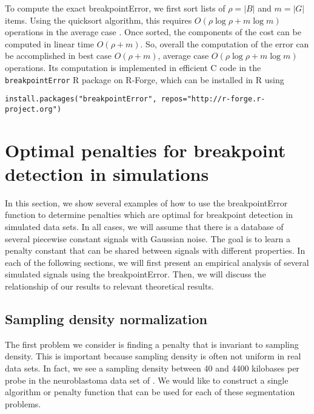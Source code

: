 \documentclass{jsfds} %
\begin{document}
To compute the exact breakpointError, we first sort lists of $\rho=|B|$
and $m=|G|$ items. Using the quicksort algorithm, this requires
$O(\rho\log \rho + m\log m)$ operations in the average case
\citep{clrs}. Once sorted, the components of the cost can be computed
in linear time $O(\rho + m)$. So, overall the computation of the error
can be accomplished in best case $O(\rho + m)$, average case $O(\rho\log \rho +
m\log m)$ operations. Its computation is implemented in efficient C
code in the \verb|breakpointError| R package on R-Forge, which can be
installed in R using

\begin{verbatim}
install.packages("breakpointError", repos="http://r-forge.r-project.org")
\end{verbatim}


\newpage

\section{Optimal penalties for breakpoint detection in simulations}
\label{sec:simulations}
In this section, we show several examples of how to use the
breakpointError function to determine penalties which are optimal for
breakpoint detection in simulated data sets. In all cases, we will
assume that there is a database of several piecewise constant signals
with Gaussian noise. The goal is to learn a penalty constant that can
be shared between signals with different properties. In each of the
following sections, we will first present an empirical analysis of
several simulated signals using the breakpointError. Then, we will
discuss the relationship of our results to relevant theoretical
results.

\subsection{Sampling density normalization}
\label{variable_density}
The first problem we consider is finding a penalty that is invariant
to sampling density. This is important because sampling density is
often not uniform in real data sets. In fact, we see a sampling
density between 40 and 4400 kilobases per probe in the neuroblastoma
data set of \citet{HOCKING-breakpoints}. We would like to construct a
single algorithm or penalty function that can be used for each of
these segmentation problems.
\end{document}
